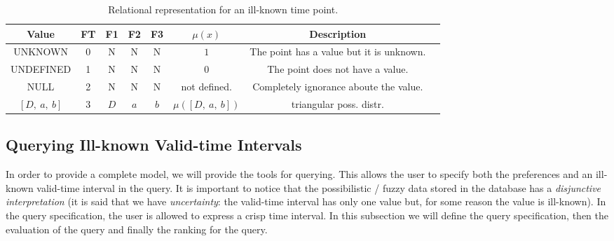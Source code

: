 %

\begin{table}
\caption{Relational representation for an ill-known time point.}%
\centering
\begin{tabular}{c c c c c c c p{2cm}}
\hline
Value & FT & F1 & F2 & F3 & $\mu(x)$ & Description \\ \hline
UNKNOWN & 0 & N & N & N  & $1$ & The point has a value but it is unknown. \\ 
UNDEFINED & 1 & N & N & N & $0$ & The point does not have a value. \\ 
NULL & 2 & N & N & N &not defined. & Completely ignorance aboute the value. \\ 
$\left[D,\ a,\ b \right]$ & 3 & $D$ & $a$ & $b$ & $\mu(\left[D,\ a,\ b \right])$ & triangular poss. distr. \\ 
\hline
\end{tabular}
\label{table:relational-representation-pvp}
\end{table}

\subsection{Querying Ill-known Valid-time Intervals}
In order to provide a complete model, we will provide the tools for querying. This allows the user to specify both the preferences and an ill-known valid-time interval in the query. It is important to notice that the possibilistic / fuzzy data stored in the database has a \emph{disjunctive interpretation} (it is said that we have \emph{uncertainty}: the valid-time interval has only one value but, for some reason the value is ill-known). In the query specification, the user is allowed to express a crisp time interval. 
In this subsection we will define the query specification, then the evaluation of the query and finally the ranking for the query.

